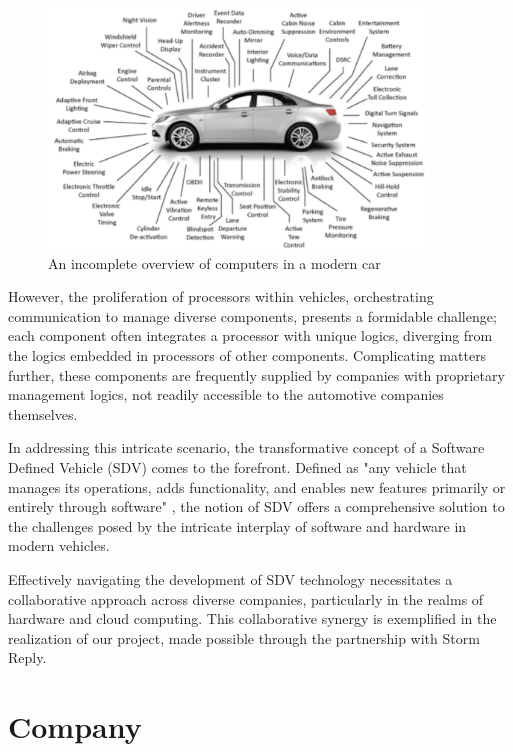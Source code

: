 \begin{figure}[h]  %
  \centering
  \includegraphics[width=0.9\textwidth]{images/vehicle_processors.png}  %
  \caption{An incomplete overview of computers in a modern car \cite{ieeeSoftwareDefinedVehicle}}
  \label{fig:VheicleProcessors}
\end{figure}

However, the proliferation of processors within vehicles, orchestrating communication to manage diverse components, presents a formidable challenge; each component often integrates a processor with unique logics, diverging from the logics embedded in processors of other components. Complicating matters further, these components are frequently supplied by companies with proprietary management logics, not readily accessible to the automotive companies themselves.

In addressing this intricate scenario, the transformative concept of a Software Defined Vehicle (SDV) comes to the forefront. Defined as "any vehicle that manages its operations, adds functionality, and enables new features primarily or entirely through software"  \cite{blackberrySDV}, the notion of SDV offers a comprehensive solution to the challenges posed by the intricate interplay of software and hardware in modern vehicles.

Effectively navigating the development of SDV technology necessitates a collaborative approach across diverse companies, particularly in the realms of hardware and cloud computing. This collaborative synergy is exemplified in the realization of our project, made possible through the partnership with Storm Reply.


\section{Company}

